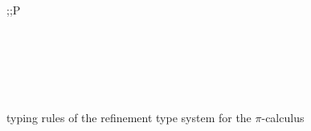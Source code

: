 \begin{figure}[tb]
    \centering
    \small
    \begin{minipage}{\linewidth}
        \centering
        \begin{prooftree}
        \end{prooftree}
    \end{minipage}
    \\
    \begin{minipage}{0.93\linewidth}
        {\env;\predenv;\chenv \vdash {}P}
    \end{minipage}
    \\
    \begin{minipage}{\linewidth}
        \centering
        \begin{prooftree}
        \end{prooftree}
    \end{minipage}
    \\
    \begin{minipage}{\linewidth}
        \centering
        \begin{prooftree}
        \end{prooftree}
    \end{minipage}
    \\
    \begin{minipage}{0.45\linewidth}
        \centering
        \begin{prooftree}
        \end{prooftree}
    \end{minipage}
    \normalsize
    \caption{ typing rules of the refinement type system for the $\pi$-calculus}
    \label{fig:refinement_type_system}
\end{figure}



